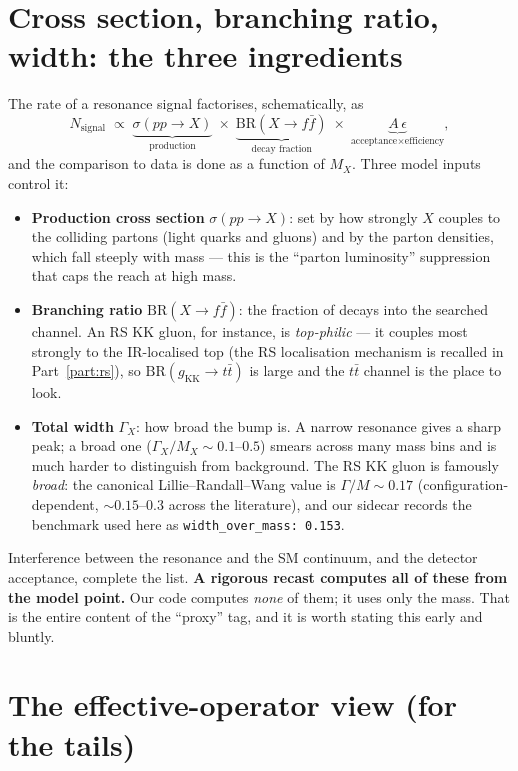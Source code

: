 \documentclass[11pt]{article}
\newcommand{\gKK}{g_{\mathrm{KK}}}
\newcommand{\code}[1]{\texttt{#1}}
\theoremstyle{definition}
\begin{document}
\section{Cross section, branching ratio, width: the three ingredients}
\label{sec:sbr}

The rate of a resonance signal factorises, schematically, as
\begin{equation}
N_{\mathrm{signal}} \;\propto\;
\underbrace{\sigma(pp\to X)}_{\text{production}}\;\times\;
\underbrace{\mathrm{BR}(X\to f\bar f)}_{\text{decay fraction}}\;\times\;
\underbrace{A\,\epsilon}_{\text{acceptance}\times\text{efficiency}},
\label{eq:rate}
\end{equation}
and the comparison to data is done as a function of $M_X$. Three model inputs
control it:
\begin{itemize}[leftmargin=1.4em]
\item \textbf{Production cross section} $\sigma(pp\to X)$: set by how strongly $X$
couples to the colliding partons (light quarks and gluons) and by the parton
densities, which fall steeply with mass --- this is the ``parton luminosity''
suppression that caps the reach at high mass.
\item \textbf{Branching ratio} $\mathrm{BR}(X\to f\bar f)$: the fraction of
decays into the searched channel. An RS KK gluon, for instance, is
\emph{top-philic} --- it couples most strongly to the IR-localised top (the RS
localisation mechanism is recalled in Part~\ref{part:rs}), so
$\mathrm{BR}(\gKK\to t\bar t)$ is large and the $t\bar t$ channel is the place
to look.
\item \textbf{Total width} $\Gamma_X$: how broad the bump is. A narrow resonance
gives a sharp peak; a broad one ($\Gamma_X/M_X\sim 0.1$--$0.5$) smears across
many mass bins and is much harder to distinguish from background. The RS KK gluon
is famously \emph{broad}: the canonical Lillie--Randall--Wang value is
$\Gamma/M\sim 0.17$ (configuration-dependent, $\sim 0.15$--$0.3$ across the
literature), and our sidecar records the benchmark used here as
\code{width\_over\_mass: 0.153}.
\end{itemize}
Interference between the resonance and the SM continuum, and the detector
acceptance, complete the list. \textbf{A rigorous recast computes all of these
from the model point.} Our code computes \emph{none} of them; it uses only the
mass. That is the entire content of the ``proxy'' tag, and it is worth stating
this early and bluntly.

\section{The effective-operator view (for the tails)}
\label{sec:eft}
\end{document}
